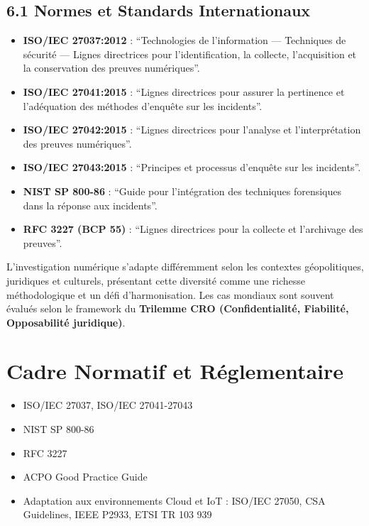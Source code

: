 \documentclass[12pt]{article}
\begin{document}
\subsection{6.1 Normes et Standards Internationaux}
\begin{itemize}[leftmargin=*]
    \item \textbf{ISO/IEC 27037:2012} : ``Technologies de l'information — Techniques de sécurité — Lignes directrices pour l'identification, la collecte, l'acquisition et la conservation des preuves numériques''.
    \item \textbf{ISO/IEC 27041:2015} : ``Lignes directrices pour assurer la pertinence et l'adéquation des méthodes d'enquête sur les incidents''.
    \item \textbf{ISO/IEC 27042:2015} : ``Lignes directrices pour l'analyse et l'interprétation des preuves numériques''.
    \item \textbf{ISO/IEC 27043:2015} : ``Principes et processus d'enquête sur les incidents''.
    \item \textbf{NIST SP 800-86} : ``Guide pour l'intégration des techniques forensiques dans la réponse aux incidents''.
    \item \textbf{RFC 3227 (BCP 55)} : ``Lignes directrices pour la collecte et l'archivage des preuves''.
\end{itemize}

L'investigation numérique s'adapte différemment selon les contextes géopolitiques, juridiques et culturels, présentant cette diversité comme une richesse méthodologique et un défi d'harmonisation. Les cas mondiaux sont souvent évalués selon le framework du \textbf{Trilemme CRO (Confidentialité, Fiabilité, Opposabilité juridique)}.


\section{Cadre Normatif et Réglementaire}
\begin{itemize}[leftmargin=*]
    \item ISO/IEC 27037, ISO/IEC 27041-27043
    \item NIST SP 800-86
    \item RFC 3227
    \item ACPO Good Practice Guide
    \item Adaptation aux environnements Cloud et IoT : ISO/IEC 27050, CSA Guidelines, IEEE P2933, ETSI TR 103 939
\end{itemize}
\end{document}
